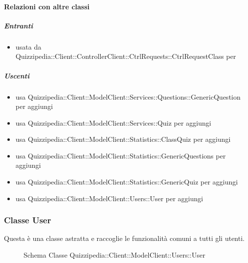 \paragraph{Relazioni con altre classi}
\subparagraph{Entranti}
\begin{itemize}
\item usata da Quizzipedia::Client::ControllerClient::CtrlRequests::CtrlRequestClass per 
\end{itemize}
\subparagraph{Uscenti}
\begin{itemize}
\item usa Quizzipedia::Client::ModelClient::Services::Questions::GenericQuestion per aggiungi
\item usa Quizzipedia::Client::ModelClient::Services::Quiz per aggiungi
\item usa Quizzipedia::Client::ModelClient::Statistics::ClassQuiz per aggiungi
\item usa Quizzipedia::Client::ModelClient::Statistics::GenericQuestions per aggiungi
\item usa Quizzipedia::Client::ModelClient::Statistics::GenericQuiz per aggiungi
\item usa Quizzipedia::Client::ModelClient::Users::User per aggiungi
\end{itemize}
\subsubsection{Classe User}
Questa è una classe astratta e raccoglie le funzionalità comuni a tutti gli utenti.
\begin{figure}[H]
\centering
\noindent{}
\caption[Schema Classe User]{Schema Classe Quizzipedia::Client::ModelClient::Users::User}
\end{figure}
